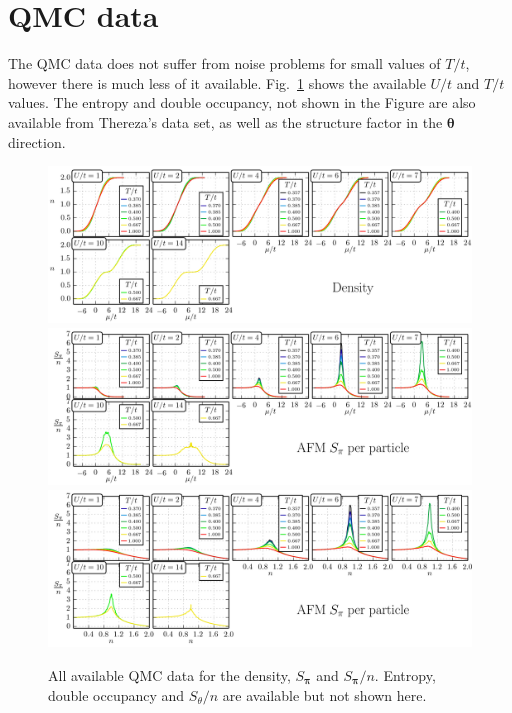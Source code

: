 \documentclass[11pt,letter]{article}
\newcommand{\bv}[1]{\ensuremath{\bm{#1}}}
\begin{document}
\section{ QMC data } 

The QMC data does not suffer from noise problems for small values of $T/t$,
however there is much less of it available.  Fig.~\ref{fig:QMCall} shows the
available $U/t$ and $T/t$ values.  The entropy and double occupancy, not shown
in the Figure are also available from Thereza's data set,  as well as the
structure factor in the $\bv{\theta}$ direction. 
\begin{figure}
    \centering
\includegraphics[width=\textwidth]{../dataplots/QMC_Final/density_All.png}
\includegraphics[width=\textwidth]{../dataplots/QMC_Final/spi_n_All.png}
\includegraphics[width=\textwidth]{../dataplots/QMC_Final/spi_n_n_All.png}
\caption{All available QMC data for the density, $S_{\bv{\pi}}$ and
$S_{\bv{\pi}}/n$.  Entropy, double occupancy and  $S_{\theta}/n$ are available
but not shown here.  }
\label{fig:QMCall}
\end{figure}
\end{document}
